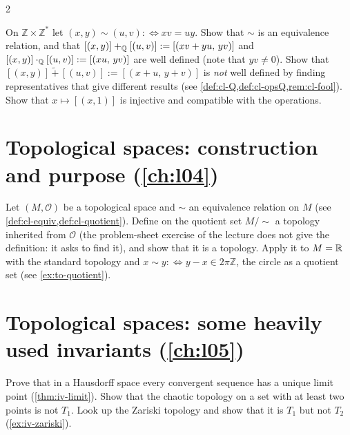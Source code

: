 \begin{paracol}{2}
\begin{exercise}\label{ex:cl-wd-Q}
On $\mathbb Z\times\mathbb Z^*$ let $(x,y)\sim(u,v):\Leftrightarrow xv=uy$. Show that $\sim$ is an equivalence relation, and that
$[(x,y)]+_{\mathbb{Q}}[(u,v)]:=[(xv+yu,\,yv)]$ and $[(x,y)]\cdot_{\mathbb{Q}}[(u,v)]:=[(xu,\,yv)]$ are well defined (note that $yv\ne0$). Show that
$[(x,y)]\,\tilde+\,[(u,v)]:=[(x+u,\,y+v)]$ is \emph{not} well defined by finding representatives that give different results
(see \cref{def:cl-Q,def:cl-opsQ,rem:cl-fool}). Show that $x\mapsto[(x,1)]$ is injective and compatible with the operations.
\end{exercise}

\section{Topological spaces: construction and purpose (\cref{ch:l04})}\label{exam:ch04}

\begin{exercise}\label{ex:to-quotient-full}
Let $(M,\mathcal O)$ be a topological space and $\sim$ an equivalence relation on $M$ (see \cref{def:cl-equiv,def:cl-quotient}). Define on the
quotient set $M/{\sim}$ a topology inherited from $\mathcal O$ (the problem-sheet exercise of the lecture does not give the definition: it
asks to find it), and show that it is a topology. Apply it to $M=\mathbb{R}$ with the standard topology and $x\sim y:\Leftrightarrow y-x\in2\pi\mathbb Z$, the
circle as a quotient set (see \cref{ex:to-quotient}).
\end{exercise}

\section{Topological spaces: some heavily used invariants (\cref{ch:l05})}\label{exam:ch05}

\begin{exercise}\label{ex:iv-limit-full}
Prove that in a Hausdorff space every convergent sequence has a unique limit point (\cref{thm:iv-limit}). Show that the chaotic topology on a set with at least two
points is not $T_1$. Look up the Zariski topology and show that it is $T_1$ but not $T_2$ (\cref{ex:iv-zariski}).
\end{exercise}


\end{paracol}
